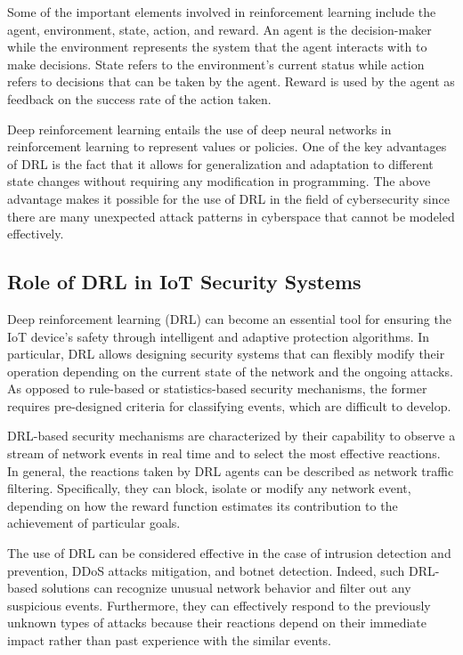 \documentclass[12pt]{article}
\begin{document}
Some of the important elements involved in reinforcement learning include the agent, environment, state, action, and reward. An agent is the decision-maker while the environment represents the system that the agent interacts with to make decisions. State refers to the environment's current status while action refers to decisions that can be taken by the agent. Reward is used by the agent as feedback on the success rate of the action taken.

Deep reinforcement learning entails the use of deep neural networks in reinforcement learning to represent values or policies.\cite{Gueriani_2023}
One of the key advantages of DRL is the fact that it allows for generalization and adaptation to different state changes without requiring any modification in programming. The above advantage makes it possible for the use of DRL in the field of cybersecurity since there are many unexpected attack patterns in cyberspace that cannot be modeled effectively.
\subsection{Role of DRL in IoT Security Systems}
Deep reinforcement learning (DRL) can become an essential tool for ensuring the IoT device's safety through intelligent and adaptive protection algorithms. In particular, DRL allows designing security systems that can flexibly modify their operation depending on the current state of the network and the ongoing attacks. As opposed to rule-based or statistics-based security mechanisms, the former requires pre-designed criteria for classifying events, which are difficult to develop.

DRL-based security\cite{hammad} mechanisms are characterized by their capability to observe a stream of network events in real time and to select the most effective reactions. In general, the reactions taken by DRL agents can be described as network traffic filtering. Specifically, they can block, isolate or modify any network event, depending on how the reward function estimates its contribution to the achievement of particular goals.

The use of DRL can be considered effective in the case of intrusion detection and prevention, DDoS attacks mitigation, and botnet detection. Indeed, such DRL-based solutions can recognize unusual network behavior and filter out any suspicious events. Furthermore, they can effectively respond to the previously unknown types of attacks because their reactions depend on their immediate impact rather than past experience with the similar events.
	
\end{document}
